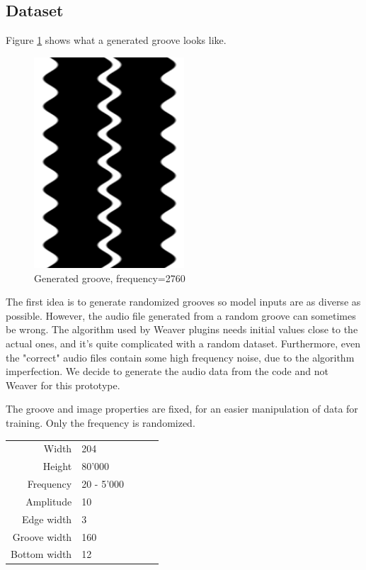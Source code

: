 \documentclass[12pt, twoside]{article}
\begin{document}
\subsection{Dataset}
Figure \ref{gengroove} shows what a generated groove looks like.
\begin{figure}
	\centering
	\includegraphics[width=0.5\textwidth]{../images/example_groove.png}
	\caption{Generated groove, frequency=2760}
	\label{gengroove}
\end{figure}
The first idea is to generate randomized grooves so model inputs are as diverse as possible. However, the audio file generated from a random groove can sometimes be wrong. The algorithm used by Weaver plugins needs initial values close to the actual ones, and it's quite complicated with a random dataset. Furthermore, even the "correct" audio files contain some high frequency noise, due to the algorithm imperfection. We decide to generate the audio data from the code and not Weaver for this prototype.

The groove and image properties are fixed, for an easier manipulation of data for training. Only the frequency is randomized.
\begin{table}
	\begin{tabular}{|r|l|lll}
		\cline{1-2}
		Width        & 204        &  &  &  \\ \cline{1-2}
		Height       & 80'000     &  &  &  \\ \cline{1-2}
		Frequency    & 20 - 5'000 &  &  &  \\ \cline{1-2}
		Amplitude    & 10         &  &  &  \\ \cline{1-2}
		Edge width   & 3          &  &  &  \\ \cline{1-2}
		Groove width & 160        &  &  &  \\ \cline{1-2}
		Bottom width & 12         &  &  &  \\ \cline{1-2}
	\end{tabular}
\end{table}
\end{document}
